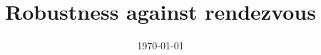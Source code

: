 \documentclass[orivec]{llncs}
\title{Robustness against rendezvous}
\author{ }
\institute{ }
\date{\today}
\begin{document}
\sloppy
\maketitle

\begin{abstract}
\end{abstract}










\end{document}
